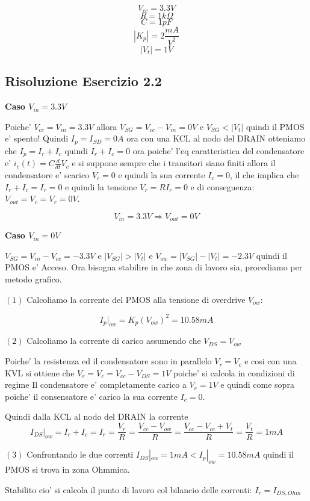 \documentclass[\main/main.tex]{subfiles}
\begin{document}
\[V_{cc} = 3.3V\]
\[R = 1k\Omega\]
\[C = 1pF\]
\[|K_p| = 2 \frac{mA}{V^2}\]
\[|V_t| = 1V\]

\clearpage
\subsection{Risoluzione Esercizio 2.2}
\textbf{Caso $V_{in} = 3.3V$}

Poiche' $V_{cc} = V_{in} = 3.3V$ allora $V_{SG} = V_{cc} - V_{in} = 0V$ e
$V_{SG} < |V_t|$ quindi il PMOS e' spento! Quindi $I_p = I_{SD} = 0A$ ora con una KCL al nodo del DRAIN otteniamo che $I_p = I_r + I_c$ quindi $I_r + I_c = 0$ ora poiche' l'eq caratteristica del condensatore e' $i_c(t) = C \frac{d}{dt}V_c$ e si suppone sempre che i transitori siano finiti allora il condensatore e' scarico $V_c = 0$ e quindi la sua corrente $I_c = 0$, il che implica che $I_r + I_c = I_r = 0$ e quindi la tensione $V_r = R I_r = 0$ e di conseguenza: $V_{out} = V_c = V_r = 0V$.

\[V_{in} = 3.3V \Rightarrow V_{out} = 0V\]

\textbf{Caso $V_{in} = 0V$}

$V_{SG} = V_{in} - V_{cc} = -3.3V$ e $|V_{SG}| > |V_t|$ e $V_{ow} = |V_{SG}| - |V_t| = -2.3V$ quindi il PMOS e' Acceso.
Ora bisogna stabilire in che zona di lavoro sia, procediamo per metodo grafico.

$(1)$ Calcoliamo la corrente del PMOS alla tensione di overdrive $V_{ow}$:

\[I_p |_{ow} = K_p \left(V_{ow}\right)^2 = 10.58mA\]

$(2)$ Calcoliamo la corrente di carico assumendo che $V_{DS} = V_{ow}$

Poiche' la resistenza ed il condensatore sono in parallelo $V_r = V_c$ e cosi con una KVL si ottiene che $V_r = V_c = V_{cc} - V_{DS} = 1V$ poiche' si calcola in condizioni di regime Il condensatore e' completamente carico a $V_c = 1V$  e quindi come sopra poiche' il consensatore e' carico la sua corrente $I_c = 0$.

Quindi dalla KCL al nodo del DRAIN la corrente \[I_{DS}|_{ow} = I_r + I_c = I_r = \frac{V_r}{R}= \frac{ V_{cc} - V_{ow}}{R} =  \frac{ V_{cc} - V_{cc} + V_t}{R} = \frac{V_t}{R} = 1mA\]

$(3)$ Confrontando le due correnti $I_{DS}|_{ow} = 1mA < I_p |_{ow} = 10.58mA$ quindi il PMOS si trova in zona Ohmmica.


Stabilito cio' si calcola il punto di lavoro col bilancio delle correnti:
$I_r = I_{DS,Ohm}$
\end{document}
